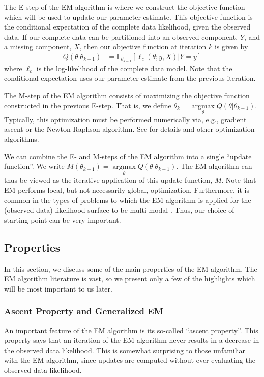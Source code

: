 \documentclass[11pt, oneside]{article}   	%
\newcommand{\bE}{\mathbb{E}}
\DeclareMathOperator*{\argmax}{argmax}
\begin{document}
The E-step of the EM algorithm is where we construct the objective function which will be used to update our parameter estimate. This objective function is the conditional expectation of the complete data likelihood, given the observed data. If our complete data can be partitioned into an observed component, $Y$, and a missing component, $X$, then our objective function at iteration $k$ is given by
%
\begin{align}
    Q(\theta|\theta_{k-1}) & = \bE_{\theta_{k-1}}[\ell_c(\theta; y, X) | Y=y]
\end{align}
%
where $\ell_c$ is the log-likelihood of the complete data model. Note that the conditional expectation uses our parameter estimate from the previous iteration.

The M-step of the EM algorithm consists of maximizing the objective function constructed in the previous E-step. That is, we define $\theta_k = \argmax\limits_\theta Q(\theta|\theta_{k-1})$. Typically, this optimization must be performed numerically via, e.g., gradient ascent or the Newton-Raphson algorithm. See \citet{Noc06} for details and other optimization algorithms. 

We can combine the E- and M-steps of the EM algorithm into a single ``update function''. We write $M(\theta_{k-1}) = \argmax\limits_\theta Q(\theta|\theta_{k-1})$. The EM algorithm can thus be viewed as the iterative application of this update function, $M$. Note that EM performs local, but not necessarily global, optimization. Furthermore, it is common in the types of problems to which the EM algorithm is applied for the (observed data) likelihood surface to be multi-modal \citep{McL08}. Thus, our choice of starting point can be very important.

\subsection{Properties}

In this section, we discuss some of the main properties of the EM algorithm. The EM algorithm literature is vast, so we present only a few of the highlights which will be most important to us later.

\subsubsection{Ascent Property and Generalized EM}
\label{sec:GEM}

An important feature of the EM algorithm is its so-called ``ascent property''. This property says that an iteration of the EM algorithm never results in a decrease in the observed data likelihood. This is somewhat surprising to those unfamiliar with the EM algorithm, since updates are computed without ever evaluating the observed data likelihood. 
\end{document}
